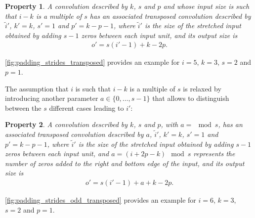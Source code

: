 \documentclass{report}
\newtheorem{prop}{Property}
\begin{document}
\begin{prop}\label{prop:padding_strides_transposed}
A convolution described by $k$, $s$ and $p$ and whose input size is such
that $i - k$ is a multiple of $s$ has an associated transposed convolution
described by $\tilde{i}'$, $k' = k$, $s' = 1$ and $p' = k - p - 1$, where
$\tilde{i}'$ is the size of the stretched input obtained by adding $s - 1$ zeros
between each input unit, and its output size is
\begin{equation*}
\begin{split}
    o' = s (i' - 1) + k - 2p.
\end{split}
\end{equation*}
\end{prop}

\autoref{fig:padding_strides_transposed} provides an example for $i = 5$, $k =
3$, $s = 2$ and $p = 1$.

The assumption that $i$ is such that $i - k$ is a multiple of $s$ is relaxed by
introducing another parameter $a \in \{0, \ldots, s - 1\}$ that allows to
distinguish between the $s$ different cases leading to $i'$:

\begin{prop}\label{prop:padding_strides_transposed_odd}
A convolution described by $k$, $s$ and $p$, with $a = \mod s$,
has an associated transposed convolution described by $a$, $\tilde{i}'$,
$k' = k$, $s' = 1$ and $p' = k - p - 1$, where
$\tilde{i}'$ is the size of the stretched input obtained by adding $s - 1$ zeros
between each input unit, and $a = (i + 2p - k) \mod s$ represents the number of
zeros added to the right and bottom edge of the input, and its output size is
\begin{equation*}
\begin{split}
    o' = s (i' - 1) + a + k - 2p.
\end{split}
\end{equation*}
\end{prop}

\autoref{fig:padding_strides_odd_transposed} provides an example for $i = 6$, $k
= 3$, $s = 2$ and $p = 1$.
\end{document}
